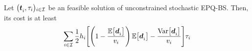 \begin{lem}\label{lem:lot-size:stochastic:single-line:models:ZIO}
Let $\bracket{\va t_i,\cover_i}_{i\in\REF}$ be an feasible solution of unconstrained stochastic EPQ-BS.
Then, its cost is at least
\begin{equation}
  \sum_{i\in\REF}\frac{1}{2}\holding_i\sqbracket{\bracket{1-\frac{\espe\sqbracket{\va\demand_i}}{\rate_i}}\espe\sqbracket{\va\demand_i} - \frac{\vari\sqbracket{\va\demand_i}}{\rate_i}}\cover_i
\end{equation}
\end{lem}



